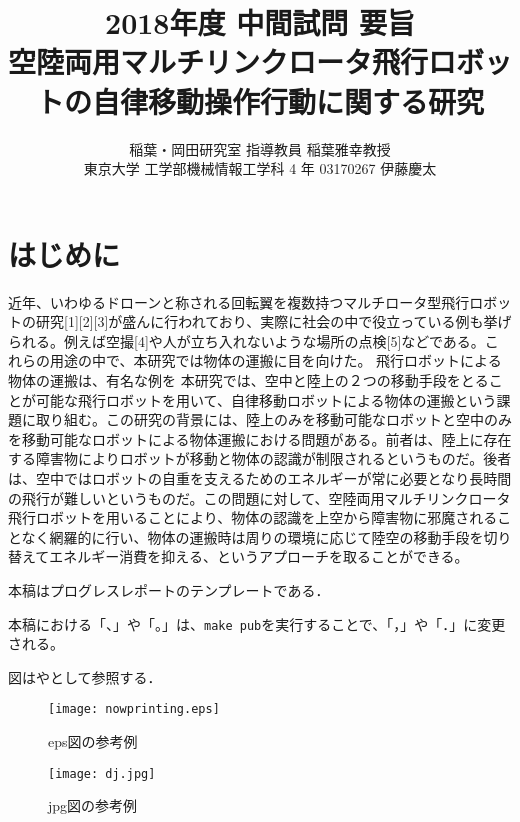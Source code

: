 \documentclass[twocolumn]{preport}
\title{2018年度 中間試問 要旨 \\
空陸両用マルチリンクロータ飛行ロボットの自律移動操作行動に関する研究}
\author{稲葉・岡田研究室 指導教員 稲葉雅幸教授 \\
東京大学 工学部機械情報工学科 4 年 03170267 伊藤慶太}
\begin{document}
\pagestyle{empty}
\maketitle
\thispagestyle{empty}
\sloppy

\section{はじめに}

近年、いわゆるドローンと称される回転翼を複数持つマルチロータ型飛行ロボットの研究[1][2][3]が盛んに行われており、実際に社会の中で役立っている例も挙げられる。例えば空撮[4]や人が立ち入れないような場所の点検[5]などである。これらの用途の中で、本研究では物体の運搬に目を向けた。
飛行ロボットによる物体の運搬は、有名な例を
本研究では、空中と陸上の２つの移動手段をとることが可能な飛行ロボットを用いて、自律移動ロボットによる物体の運搬という課題に取り組む。この研究の背景には、陸上のみを移動可能なロボットと空中のみを移動可能なロボットによる物体運搬における問題がある。前者は、陸上に存在する障害物によりロボットが移動と物体の認識が制限されるというものだ。後者は、空中ではロボットの自重を支えるためのエネルギーが常に必要となり長時間の飛行が難しいというものだ。この問題に対して、空陸両用マルチリンクロータ飛行ロボットを用いることにより、物体の認識を上空から障害物に邪魔されることなく網羅的に行い、物体の運搬時は周りの環境に応じて陸空の移動手段を切り替えてエネルギー消費を抑える、というアプローチを取ることができる。

本稿はプログレスレポートのテンプレートである\cite{Sakai}．

本稿における「、」や「。」は、\verb|make pub|を実行することで、「，」や「．」に変更される。

図はやとして参照する．

\begin{figure}[tbh]
 \begin{center}
  \begin{minipage}{0.3\columnwidth}
   \texttt{[image: nowprinting.eps]}
   \caption{eps図の参考例}
  \end{minipage}
  \hspace{0.15\columnwidth}
  \begin{minipage}{0.3\columnwidth}
   \texttt{[image: dj.jpg]}
   \caption{jpg図の参考例}
  \end{minipage}
  \label{figure:nowprinting}
 \end{center}
\end{figure}
\end{document}
